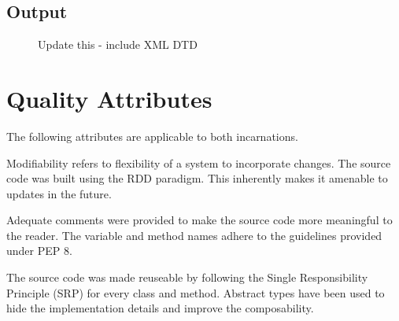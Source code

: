     \subsection{Output}
    \begin{figure}[h!]
      \centering
      \caption{Update this - include XML DTD}
      \label{fig:XML output}
    \end{figure}

\section{Quality Attributes}
  \begin{flushleft}
    The following attributes are applicable to both incarnations.
  \end{flushleft}
    \begin{flushleft}
      Modifiability refers to flexibility of a system to incorporate changes. The source code was built using the RDD paradigm. This inherently makes it amenable to updates in the future.
    \end{flushleft}

    \begin{flushleft}
      Adequate comments were provided to make the source code more meaningful to the reader. The variable and method names adhere to the guidelines provided under PEP 8. 
    \end{flushleft}

    \begin{flushleft}
      The source code was made reuseable by following the Single Responsibility Principle (SRP) for every class and method. Abstract types have been used to hide the implementation details and improve the composability.
    \end{flushleft}


